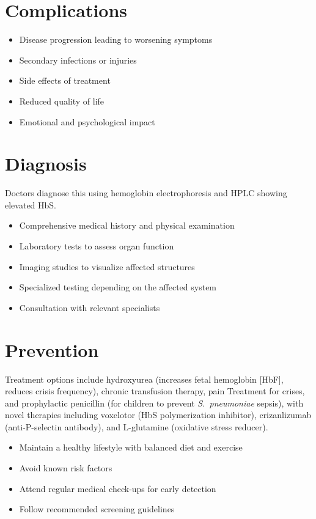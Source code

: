 \section{Complications}
\begin{itemize}[noitemsep]
  \item Disease progression leading to worsening symptoms
  \item Secondary infections or injuries
  \item Side effects of treatment
  \item Reduced quality of life
  \item Emotional and psychological impact
\end{itemize}
\section{Diagnosis}
Doctors diagnose this using hemoglobin electrophoresis and HPLC showing elevated HbS.

\begin{itemize}[noitemsep]
  \item Comprehensive medical history and physical examination
  \item Laboratory tests to assess organ function
  \item Imaging studies to visualize affected structures
  \item Specialized testing depending on the affected system
  \item Consultation with relevant specialists
\end{itemize}
\section{Prevention}
Treatment options include hydroxyurea (increases fetal hemoglobin [HbF], reduces crisis frequency), chronic transfusion therapy, pain Treatment for crises, and prophylactic penicillin (for children to prevent \textit{S.~pneumoniae} sepsis), with novel therapies including voxelotor (HbS polymerization inhibitor), crizanlizumab (anti-P-selectin antibody), and L-glutamine (oxidative stress reducer).

\begin{itemize}[noitemsep]
  \item Maintain a healthy lifestyle with balanced diet and exercise
  \item Avoid known risk factors
  \item Attend regular medical check-ups for early detection
  \item Follow recommended screening guidelines
\end{itemize}
